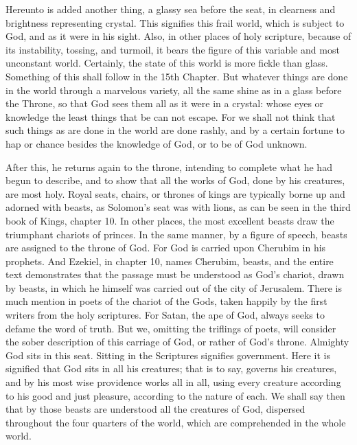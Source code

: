 Hereunto is added another thing, a glassy sea before the seat, in clearness and brightness representing crystal. This signifies this frail world, which is subject to God, and as it were in his sight. Also, in other places of holy scripture, because of its instability, tossing, and turmoil, it bears the figure of this variable and most unconstant world. Certainly, the state of this world is more fickle than glass. Something of this shall follow in the 15th Chapter. But whatever things are done in the world through a marvelous variety, all the same shine as in a glass before the Throne, so that God sees them all as it were in a crystal: whose eyes or knowledge the least things that be can not escape. For we shall not think that such things as are done in the world are done rashly, and by a certain fortune to hap or chance besides the knowledge of God, or to be of God unknown.

After this, he returns again to the throne, intending to complete what he had begun to describe, and to show that all the works of God, done by his creatures, are most holy. Royal seats, chairs, or thrones of kings are typically borne up and adorned with beasts, as Solomon’s seat was with lions, as can be seen in the third book of Kings, chapter 10. In other places, the most excellent beasts draw the triumphant chariots of princes. In the same manner, by a figure of speech, beasts are assigned to the throne of God. For God is carried upon Cherubim in his prophets. And Ezekiel, in chapter 10, names Cherubim, beasts, and the entire text demonstrates that the passage must be understood as God’s chariot, drawn by beasts, in which he himself was carried out of the city of Jerusalem. There is much mention in poets of the chariot of the Gods, taken happily by the first writers from the holy scriptures. For Satan, the ape of God, always seeks to defame the word of truth. But we, omitting the triflings of poets, will consider the sober description of this carriage of God, or rather of God’s throne. Almighty God sits in this seat. Sitting in the Scriptures signifies government. Here it is signified that God sits in all his creatures; that is to say, governs his creatures, and by his most wise providence works all in all, using every creature according to his good and just pleasure, according to the nature of each. We shall say then that by those beasts are understood all the creatures of God, dispersed throughout the four quarters of the world, which are comprehended in the whole world.

